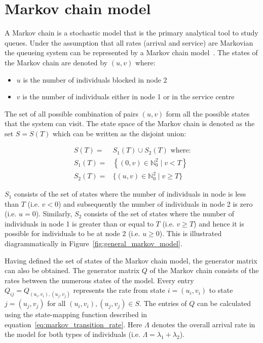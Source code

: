 \section{Markov chain model}\label{sec:markov_model}

A Markov chain is a stochastic model that is the primary analytical tool to
study queues.
Under the assumption that all rates (arrival and service) are Markovian the
queueing system can be represented by a Markov chain
model~\cite{kemeny1976markov}.
The states of the Markov chain are denoted by \((u,v)\) where:

\begin{itemize}
    \item \(u\) is the number of individuals blocked in node 2
    \item \(v\) is the number of individuals either in node 1 or in the
    service centre
\end{itemize}

The set of all possible combination of pairs \((u, v)\) form all the possible
states that the system can visit.
The state space of the Markov chain is denoted as the set \(S=S(T)\) which can
be written as the disjoint union:

\begin{align}
    S(T) =& S_1(T) \cup S_2(T) \text{ where:} \nonumber \\
    S_1(T) =& \left\{(0, v)\in\mathbb{N}_0^2 \; | \; v < T \right\}
    \label{eq:definition_of_S_as_disjoint_union} \\
    S_2(T) =& \{(u, v)\in\mathbb{N}_0^2 \; | \; v \geq T \} \nonumber
\end{align}

\(S_1\) consists of the set of states where the number of individuals in node
is less than \(T\) (i.e. \(v < 0\)) and subsequently the number of
individuals in node 2 is zero (i.e. \(u = 0\)).
Similarly, \(S_2\) consists of the set of states where the number of individuals
in node 1 is greater than or equal to \(T\) (i.e. \(v \geq T\)) and
hence it is possible for individuals to be at node 2 (i.e.
\(u \geq 0\)).
This is illustrated diagrammatically in Figure~\ref{fig:general_markov_model}.

Having defined the set of states of the Markov chain model, the generator
matrix can also be obtained.
The generator matrix \(Q\) of the Markov chain consists of the
rates between the numerous states of the model.
Every entry \( Q_{ij} = Q_{(u_i, v_i),(u_j, v_j)} \) represents the rate from
state \( i = (u_i, v_i) \) to state \( j = (u_j , v_j) \) for all
\( (u_i, v_i), (u_j, v_j) \in S \).
The entries of \(Q\) can be calculated using the state-mapping function
described in equation~\eqref{eq:markov_transition_rate}.
Here \(\Lambda\) denotes the overall arrival rate in the model for
both types of individuals (i.e. \(\Lambda = \lambda_1 + \lambda_2\)).

